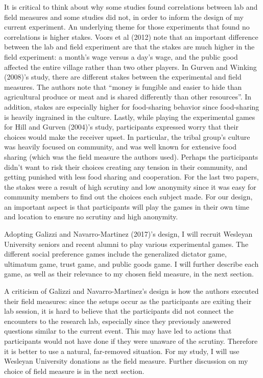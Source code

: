 \documentclass[12pt]{article}
\begin{document}
{\color{red}It is critical to think about why some studies found correlations between lab and field measures and some studies did not, in order to inform the design of my current experiment. An underlying theme for those experiments that found no correlations is higher stakes. Voors et al (2012) note that an important difference between the lab and field experiment are that the stakes are much higher in the field experiment: a month\rq s wage versus a day\rq s wage, and the public good affected the entire village rather than two other players. In Gurven and Winking (2008)\rq s study, there are different stakes between the experimental and field measures. The authors note that ``money is fungible and easier to hide than agricultural produce or meat and is shared differently than other resources''. In addition, stakes are especially higher for food-sharing behavior since food-sharing is heavily ingrained in the culture. Lastly, while playing the experimental games for Hill and Gurven (2004)\rq s study, participants expressed worry that their choices would make the receiver upset. In particular, the tribal group\rq s culture was heavily focused on community, and was well known for extensive food sharing (which was the field measure the authors used). Perhaps the participants didn\rq t want to risk their choices creating any tension in their community, and getting punished with less food sharing and cooperation. For the last two papers, the stakes were a result of high scrutiny and low anonymity since it was easy for community members to find out the choices each subject made. For our design, an important aspect is that participants will play the games in their own time and location to ensure no scrutiny and high anonymity. }

Adopting Galizzi and Navarro-Martinez (2017)'s design, I will recruit Wesleyan University seniors and recent alumni to play various experimental games.  The different social preference games include the generalized dictator game, ultimatum game, trust game, and public goods game. I will further describe each game, as well as their relevance to my chosen field measure, in the next section.

A criticism of Galizzi and Navarro-Martinez\rq s design is how the authors executed their field measures: since the setups occur as the participants are exiting their lab session, it is hard to believe that the participants did not connect the encounters to the research lab, especially since they previously answered questions similar to the current event. This may have led to actions that participants would not have done if they were unaware of the scrutiny. Therefore it is better to use a natural, far-removed situation. For my study, I will use Wesleyan University donations as the field measure. Further discussion on my choice of field measure is in the next section.
\end{document}
